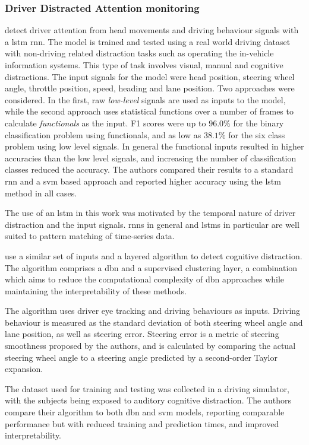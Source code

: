 \documentclass[11pt, parskip=half*,twoside=false]{scrbook}
\begin{document}
\subsubsection{Driver Distracted Attention monitoring}
\citet{wollmerOnlineDriverDistraction2011} detect driver attention from head movements and driving behaviour signals with a \gls{lstm} \gls{rnn}. The model is trained and tested using a real world driving dataset with non-driving related distraction tasks such as operating the in-vehicle information systems. This type of task involves visual, manual and cognitive distractions. The input signals for the model were head position, steering wheel angle, throttle position, speed, heading and lane position. Two approaches were considered. In the first, raw \emph{low-level} signals are used as inputs to the model, while the second approach uses statistical functions over a number of frames to calculate \emph{functionals} as the input. F1 scores were up to $96.0\%$ for the binary classification problem using functionals, and as low as $38.1\%$ for the six class problem using low level signals. In general the functional inputs resulted in higher accuracies than the low level signals, and increasing the number of classification classes reduced the accuracy. The authors compared their results to a standard \gls{rnn} and a \gls{svm} based approach and reported higher accuracy using the \gls{lstm} method in all cases.

The use of an \gls{lstm} in this work was motivated by the temporal nature of driver distraction and the input signals. \Glspl{rnn} in general and \glspl{lstm} in particular are well suited to pattern matching of time-series data.

\citet{liangHybridBayesianNetwork2014} use a similar set of inputs and a layered algorithm to detect cognitive distraction. The algorithm comprises a \gls{dbn} and a supervised clustering layer, a combination which aims to reduce the computational complexity of \gls{dbn} approaches while maintaining the interpretability of these methods.

The algorithm uses driver eye tracking and driving behaviours as inputs. Driving behaviour is measured as the standard deviation of both steering wheel angle and lane position, as well as steering error. Steering error is a metric of steering smoothness proposed by the authors, and is calculated by comparing the actual steering wheel angle to a steering angle predicted by a second-order Taylor expansion. 

The dataset used for training and testing was collected in a driving simulator, with the subjects being exposed to auditory cognitive distraction. The authors compare their algorithm to both \gls{dbn} and \gls{svm} models, reporting comparable performance but with reduced training and prediction times, and improved interpretability.
\end{document}
